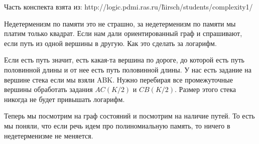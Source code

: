 \begin{Rem}
Часть конспекта взята из: http://logic.pdmi.ras.ru/\~hirsch/students/complexity1/
\end{Rem}

Недетерменизм по памяти это не страшно, за недетерменизм по памяти мы платим только квадрат. Если нам 
дали ориентированный граф и спрашивают, если путь из одной вершины в другую. Как это сделать за логарифм. 

Если есть путь значит, есть какая-та вершина по дороге, до которой есть путь половинной длины и от нее есть путь 
половинной длины. У нас есть задание на вершине стека если мы взяли ABK. Нужно перебирая все промежуточные вершины обработать задания  
$AC(K/2)$ и $CB(K/2)$. Размер этого стека никогда не будет привышать логарифм.

Теперь мы посмотрим на граф состояний и посмотрим на наличие путей. То есть мы поняли, что
если речь идем про полиномиальную память, то ничего в недетерменизме не меняется.  
